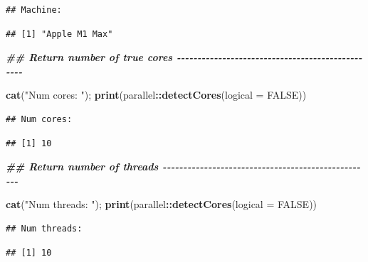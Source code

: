 \documentclass[
  11pt,
]{article}
\newenvironment{Shaded}{\begin{snugshade}}{\end{snugshade}}
\newcommand{\AttributeTok}[1]{\textcolor[rgb]{0.13,0.29,0.53}{#1}}
\newcommand{\ConstantTok}[1]{\textcolor[rgb]{0.56,0.35,0.01}{#1}}
\newcommand{\DocumentationTok}[1]{\textcolor[rgb]{0.56,0.35,0.01}{\textbf{\textit{#1}}}}
\newcommand{\FunctionTok}[1]{\textcolor[rgb]{0.13,0.29,0.53}{\textbf{#1}}}
\newcommand{\NormalTok}[1]{#1}
\newcommand{\SpecialCharTok}[1]{\textcolor[rgb]{0.81,0.36,0.00}{\textbf{#1}}}
\newcommand{\StringTok}[1]{\textcolor[rgb]{0.31,0.60,0.02}{#1}}
\begin{document}
\begin{Shaded}
\end{Shaded}

\begin{verbatim}
## Machine:
\end{verbatim}

\begin{verbatim}
## [1] "Apple M1 Max"
\end{verbatim}

\begin{Shaded}
\begin{Highlighting}[]
\DocumentationTok{\#\# Return number of true cores {-}{-}{-}{-}{-}{-}{-}{-}{-}{-}{-}{-}{-}{-}{-}{-}{-}{-}{-}{-}{-}{-}{-}{-}{-}{-}{-}{-}{-}{-}{-}{-}{-}{-}{-}{-}{-}{-}{-}{-}{-}{-}{-}{-}{-}{-}{-}{-}{-}}

\FunctionTok{cat}\NormalTok{(}\StringTok{"Num cores:   "}\NormalTok{); }\FunctionTok{print}\NormalTok{(parallel}\SpecialCharTok{::}\FunctionTok{detectCores}\NormalTok{(}\AttributeTok{logical =} \ConstantTok{FALSE}\NormalTok{))}
\end{Highlighting}
\end{Shaded}

\begin{verbatim}
## Num cores:
\end{verbatim}

\begin{verbatim}
## [1] 10
\end{verbatim}

\begin{Shaded}
\begin{Highlighting}[]
\DocumentationTok{\#\# Return number of threads {-}{-}{-}{-}{-}{-}{-}{-}{-}{-}{-}{-}{-}{-}{-}{-}{-}{-}{-}{-}{-}{-}{-}{-}{-}{-}{-}{-}{-}{-}{-}{-}{-}{-}{-}{-}{-}{-}{-}{-}{-}{-}{-}{-}{-}{-}{-}{-}{-}{-}{-}}

\FunctionTok{cat}\NormalTok{(}\StringTok{"Num threads: "}\NormalTok{); }\FunctionTok{print}\NormalTok{(parallel}\SpecialCharTok{::}\FunctionTok{detectCores}\NormalTok{(}\AttributeTok{logical =} \ConstantTok{FALSE}\NormalTok{))}
\end{Highlighting}
\end{Shaded}

\begin{verbatim}
## Num threads:
\end{verbatim}

\begin{verbatim}
## [1] 10
\end{verbatim}
\end{document}
